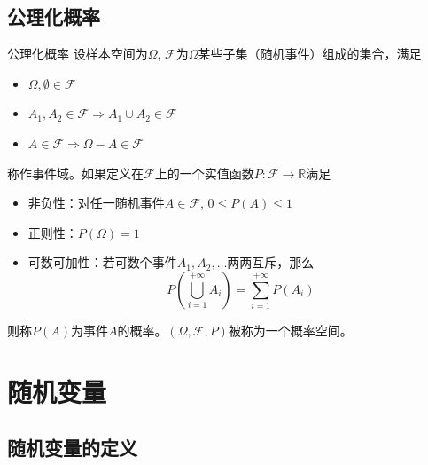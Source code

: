 
\subsection{公理化概率}


\begin{frame}

\begin{block}{公理化概率}
设样本空间为$\Omega$, $\mathcal{F}$为$\Omega$某些子集（随机事件）组成的集合，满足
\begin{itemize}
\item $\Omega, \emptyset \in \mathcal{F}$
\item $A_1,A_2\in \mathcal{F} \Longrightarrow A_1\cup A_2 \in \mathcal{F}$
\item $A\in \mathcal{F} \Longrightarrow \Omega - A \in \mathcal{F}$
\end{itemize}
称作事件域。如果定义在$\mathcal{F}$上的一个实值函数$P: \mathcal{F} \to \mathbb{R}$满足
\begin{itemize}
\item 非负性：对任一随机事件$A\in\mathcal{F}$, $0 \le P(A) \le 1$
\item 正则性：$P(\Omega) = 1$
\item 可数可加性：若可数个事件$A_1,A_2,\ldots$两两互斥，那么
\[P(\bigcup\limits_{i=1}^{+\infty} A_i) = \sum\limits_{i=1}^{+\infty} P(A_i)\]
\end{itemize}
则称$P(A)$为事件$A$的概率。$(\Omega, \mathcal{F}, P)$被称为一个概率空间。
\end{block}

\end{frame}


\section{随机变量}


\subsection{随机变量的定义}


